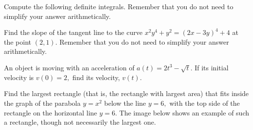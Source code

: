 \documentclass[addpoints,12pt]{exam}
\begin{document}
\begin{questions}




 \question Compute the following definite integrals. Remember that you do not need to simplify
your answer arithmetically.


\newpage


\vfill

\question[10] Find the slope of the tangent line to the curve $x^2y^4 + y^2 = (2x-3y)^4 +4 $ at
the point $(2,1).$ Remember that you do not need to simplify your answer arithmetically.

\newpage




\question[6] An object is moving with an acceleration of $a(t) = 2t^3 -\sqrt{t}.$ If its initial velocity
is $v(0) = 2,$ find its velocity, $v(t).$





\vfill

\newpage

\question Find the largest rectangle (that is, the rectangle with largest area) that fits inside the
graph of the parabola $y=x^2$ below the line $y=6,$ with the top side of the rectangle on the
horizontal line $y=6.$ The image below shows an example of such a rectangle, though not
necessarily the largest one.


\end{questions}
\end{document}
